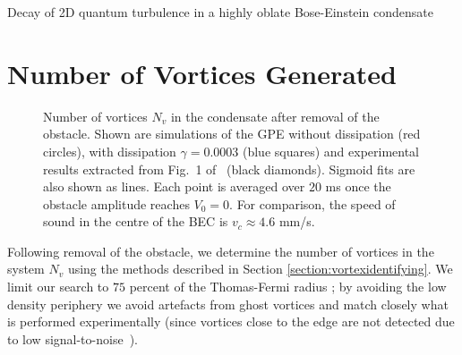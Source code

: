 \begin{chapter}{\label{cha:shin}Decay of 2D quantum turbulence in a highly oblate Bose-Einstein condensate}
\section{Number of Vortices Generated}
\begin{figure}
\begin{center}
\end{center}
\caption{\label{fig:N_vV} Number of vortices $N_v$ in the condensate after removal of the obstacle. Shown are simulations of the GPE without dissipation (red circles), with dissipation $\gamma = 0.0003$ (blue squares) and experimental results extracted from Fig.~1 of~\citep{kwon_moon_14} (black diamonds). Sigmoid fits are also shown as lines. Each point is averaged over $20$ ms once the obstacle amplitude reaches $V_0=0$.  For comparison, the speed of sound in the centre of the BEC is $v_c\approx 4.6$ mm/s.  }
\end{figure} 
Following removal of the obstacle, we determine the number of vortices in the system $N_v$ using the methods described in Section \ref{section:vortexidentifying}.  
We limit our search to $75$ percent of the Thomas-Fermi radius ; by avoiding the low density periphery we avoid artefacts from ghost vortices and match closely what is performed experimentally (since vortices close to the edge are not detected due to low signal-to-noise~\citep{shin_private}). 


\end{chapter}
